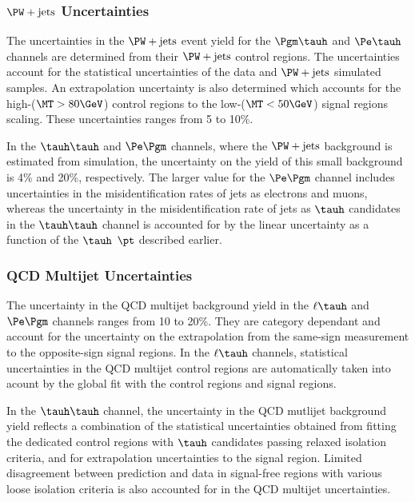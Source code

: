 \subsubsection{$\PW+\text{jets}$ Uncertainties}
The uncertainties in the $\PW+\text{jets}$ event yield for the $\Pgm\tauh$ and $\Pe\tauh$ channels are determined 
from their $\PW+\text{jets}$ control regions. The uncertainties account for the statistical uncertainties of the
data and $\PW+\text{jets}$ simulated samples. An extrapolation uncertainty is also determined which accounts for
the high-\MT ($\MT>80\GeV$) control regions to the low-\MT ($\MT<50\GeV$) signal regions scaling.
These uncertainties ranges from 5 to 10\%.

In the $\tauh\tauh$ and $\Pe\Pgm$ channels, where the $\PW+\text{jets}$ background is estimated from simulation, the 
uncertainty on the yield of this small background is 4\% and 20\%, respectively. The larger value for the 
$\Pe\Pgm$ channel includes uncertainties in the misidentification rates of jets as electrons and muons, whereas the 
uncertainty in the misidentification rate of jets as $\tauh$ candidates in the $\tauh\tauh$ channel is accounted for 
by the linear uncertainty as a function of the $\tauh$ $\pt$ described earlier.


\subsubsection{QCD Multijet Uncertainties}
The uncertainty in the QCD multijet background yield in the $\ell\tauh$ and $\Pe\Pgm$ channels ranges from 10 to 20\%.
They are category dependant and account for the uncertainty on the extrapolation from the same-sign measurement to 
the opposite-sign signal regions. In the  $\ell\tauh$ channels, statistical uncertainties in the QCD multijet
control regions are automatically taken into acount by the global fit with the control regions and signal regions.

In the $\tauh\tauh$ channel, the uncertainty in the QCD mutlijet background yield reflects a combination of the statistical
uncertainties obtained from fitting the dedicated control regions with $\tauh$ candidates passing relaxed isolation 
criteria, and for extrapolation uncertainties to the signal region. Limited 
disagreement between prediction and data in signal-free regions with various loose isolation criteria is also accounted
for in the QCD multijet uncertainties. 

